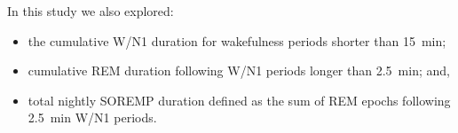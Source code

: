In this study we also explored: 
\begin{itemize}
    \item the cumulative \ac{W}/\ac{N1} duration for wakefulness periods shorter than \SI{15}{\minute};
    \item cumulative \ac{REM} duration following \ac{W}/\ac{N1} periods longer than \SI{2.5}{\minute}; and,
    \item total nightly \ac{SOREMP} duration defined as the sum of \ac{REM} epochs following \SI{2.5}{\minute} \ac{W}/\ac{N1} periods.
\end{itemize}



